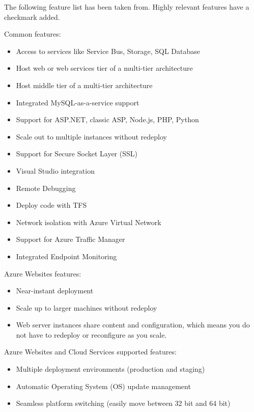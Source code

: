 The following feature list has been taken from\cite{Microsoft_Corporation2014-gg}. Highly relevant features have a checkmark added.
 
Common features:
\begin{itemize}
\item Access to services like Service Bus, Storage, SQL Database \checkmark
\item Host web or web services tier of a multi-tier architecture \checkmark
\item Host middle tier of a multi-tier architecture \checkmark
\item Integrated MySQL-as-a-service support
\item Support for ASP.NET, classic ASP, Node.js, PHP, Python\checkmark
\item Scale out to multiple instances without redeploy \checkmark
\item Support for Secure Socket Layer (SSL)
\item Visual Studio integration \checkmark
\item Remote Debugging \checkmark
\item Deploy code with TFS
\item Network isolation with Azure Virtual Network
\item Support for Azure Traffic Manager \checkmark
\item Integrated Endpoint Monitoring
\end{itemize}


Azure Websites features:
\begin{itemize}
\item Near-instant deployment \checkmark
\item Scale up to larger machines without redeploy \checkmark
\item Web server instances share content and configuration, which means you do not have to redeploy or reconfigure as you scale.
\end{itemize}

Azure Websites and Cloud Services supported features:
\begin{itemize}
\item Multiple deployment environments (production and staging) \checkmark
\item Automatic Operating System (OS) update management \checkmark
\item Seamless platform switching (easily move between 32 bit and 64 bit)
\end{itemize}


